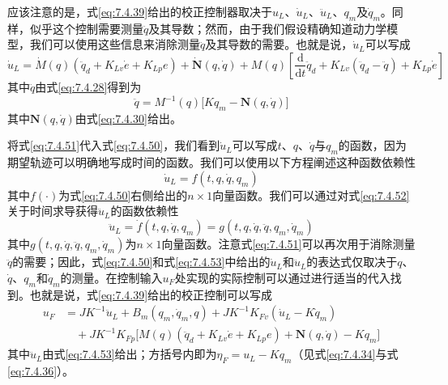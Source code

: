 \documentclass[UTF8]{ctexart}
\begin{document}
应该注意的是，式\eqref{eq:7.4.39}给出的校正控制器取决于$u_L$、$\dot{u}_L$、$\ddot{u}_L$、$q_m$及$\dot{q}_m$。同样，似乎这个控制需要测量$\ddot{q}$及其导数；然而，由于我们假设精确知道动力学模型，我们可以使用这些信息来消除测量$\ddot{q}$及其导数的需要。也就是说，$\dot{u}_L$可以写成
\begin{equation}\label{eq:7.4.50}
\dot{u}_L = \dot{M}(q)(\ddot{q}_d + K_{Lv}\dot{e} + K_{Lp}e) + \dot{\mathbf{N}}(q,\dot{q}) + M(q)\left[\frac{\mathrm{d}}{\mathrm{d}t}\ddot{q}_d + K_{Lv}(\ddot{q}_d - \ddot{q}) + K_{Lp}\dot{e}\right]
\end{equation}
其中$\ddot{q}$由式\eqref{eq:7.4.28}得到为
\begin{equation}\label{eq:7.4.51}
\ddot{q} = M^{-1}(q)\bigl[Kq_m - \mathbf{N}(q,\dot{q})\bigr]
\end{equation}
其中$\mathbf{N}(q,\dot{q})$由式\eqref{eq:7.4.30}给出。

将式\eqref{eq:7.4.51}代入式\eqref{eq:7.4.50}，我们看到$\dot{u}_L$可以写成$t$、$q$、$\dot{q}$与$q_m$的函数，因为期望轨迹可以明确地写成时间的函数。我们可以使用以下方程阐述这种函数依赖性
\begin{equation}\label{eq:7.4.52}
\dot{u}_L = f(t,q,\dot{q},q_m)
\end{equation}
其中$f(\cdot)$为式\eqref{eq:7.4.50}右侧给出的$n \times 1$向量函数。我们可以通过对式\eqref{eq:7.4.52}关于时间求导获得$\ddot{u}_L$的函数依赖性
\begin{equation}\label{eq:7.4.53}
\ddot{u}_L = \dot{f}(t,q,\dot{q},q_m) = g(t,q,\dot{q},\ddot{q},q_m,\dot{q}_m)
\end{equation}
其中$g(t,q,\dot{q},\ddot{q},q_m,\dot{q}_m)$为$n \times 1$向量函数。注意式\eqref{eq:7.4.51}可以再次用于消除测量$\ddot{q}$的需要；因此，式\eqref{eq:7.4.50}和式\eqref{eq:7.4.53}中给出的$\dot{u}_L$和$\ddot{u}_L$的表达式仅取决于$q$、$\dot{q}$、$q_m$和$\dot{q}_m$的测量。在控制输入$u_F$处实现的实际控制可以通过进行适当的代入找到。也就是说，式\eqref{eq:7.4.39}给出的校正控制可以写成
\begin{equation}\label{eq:7.4.54}
\begin{aligned}
u_F &= J K^{-1}\ddot{u}_L + B_m(q_m,\dot{q}_m,q) + J K^{-1}K_{Fv}(\dot{u}_L - K\dot{q}_m) \\
&\quad {} + J K^{-1}K_{Fp}\bigl[M(q)(\ddot{q}_d + K_{Lv}\dot{e} + K_{Lp}e) + \mathbf{N}(q,\dot{q}) - K q_m\bigr]
\end{aligned}
\end{equation}
其中$\ddot{u}_L$由式\eqref{eq:7.4.53}给出；方括号内即为$\eta_F=u_L-Kq_m$（见式\eqref{eq:7.4.34}与式\eqref{eq:7.4.36}）。
\end{document}
